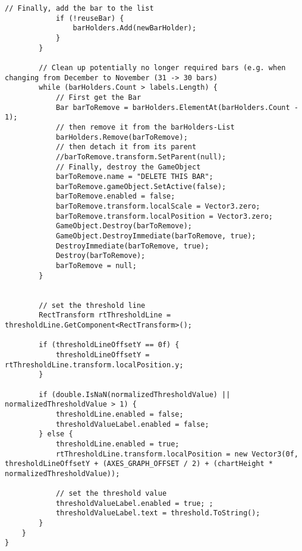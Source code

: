 \begin{lstlisting}[caption={/Assets/Scripts/Charts/BarChart.cs}, label={lst:scripts_charts_barchart}]
			// Finally, add the bar to the list
			if (!reuseBar) {
				barHolders.Add(newBarHolder);
			}
		}
	
		// Clean up potentially no longer required bars (e.g. when changing from December to November (31 -> 30 bars)
		while (barHolders.Count > labels.Length) {
			// First get the Bar
			Bar barToRemove = barHolders.ElementAt(barHolders.Count - 1);
			// then remove it from the barHolders-List
			barHolders.Remove(barToRemove);
			// then detach it from its parent
			//barToRemove.transform.SetParent(null);
			// Finally, destroy the GameObject
			barToRemove.name = "DELETE THIS BAR";
			barToRemove.gameObject.SetActive(false);
			barToRemove.enabled = false;
			barToRemove.transform.localScale = Vector3.zero;
			barToRemove.transform.localPosition = Vector3.zero;
			GameObject.Destroy(barToRemove);
			GameObject.DestroyImmediate(barToRemove, true);
			DestroyImmediate(barToRemove, true);
			Destroy(barToRemove);
			barToRemove = null;
		}
	
	
		// set the threshold line
		RectTransform rtThresholdLine = thresholdLine.GetComponent<RectTransform>();
		
		if (thresholdLineOffsetY == 0f) {
			thresholdLineOffsetY = rtThresholdLine.transform.localPosition.y;
		}
		
		if (double.IsNaN(normalizedThresholdValue) || normalizedThresholdValue > 1) {
			thresholdLine.enabled = false;
			thresholdValueLabel.enabled = false;
		} else {
			thresholdLine.enabled = true;
			rtThresholdLine.transform.localPosition = new Vector3(0f, thresholdLineOffsetY + (AXES_GRAPH_OFFSET / 2) + (chartHeight * normalizedThresholdValue));
			
			// set the threshold value
			thresholdValueLabel.enabled = true; ;
			thresholdValueLabel.text = threshold.ToString();
		}
	}
}
\end{lstlisting}

